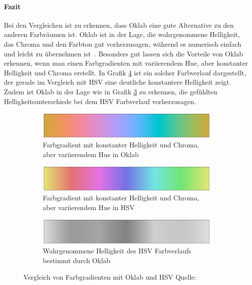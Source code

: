 \documentclass[12pt, a4paper, ngerman]{article}
\begin{document}
\paragraph{Fazit}
Bei den Vergleichen ist zu erkennen, dass Oklab eine gute Alternative zu den anderen Farbräumen ist.
Oklab ist in der Lage, die wahrgenommene Helligkeit, das Chroma und den Farbton gut vorherzusagen, 
während es numerisch einfach und leicht zu übernehmen ist~\cite{Oklab_2020}.
Besonders gut lassen sich die Vorteile von Oklab erkennen, 
wenn man einen Farbgradienten mit variierendem Hue, aber konstanter Helligkeit und Chroma erstellt. 
In Grafik \ref{fig:oklab_hsv} ist ein solcher Farbverlauf dargestellt, der gerade im Vergleich mit HSV eine deutliche konstantere Helligkeit zeigt. 
Zudem ist Oklab in der Lage wie in Grafik \ref{fig:hsv_lightness} zu erkennen, die gefühlten Helligkeitsunterschiede bei dem HSV Farbverlauf vorherzusagen.

\begin{figure}
  \centering
  \begin{subfigure}[b]{\linewidth}
  \centering
  \includegraphics[width=0.9\linewidth]{Grafiken/Oklab_HSV/hue_oklab.png}
  \caption{Farbgradient mit konstanter Helligkeit und Chroma, aber variierendem Hue in Oklab}
  \label{fig:hue_oklab}
  \end{subfigure}
  
  \begin{subfigure}[b]{\linewidth}
  \centering
  \includegraphics[width=0.9\linewidth]{Grafiken/Oklab_HSV/hue_hsv.png}
  \caption{Farbgradient mit konstanter Helligkeit und Chroma, aber variierendem Hue in HSV}
  \label{fig:hue_hsv}
  \end{subfigure}
  
  \begin{subfigure}[b]{\linewidth}
  \centering
  \includegraphics[width=0.9\linewidth]{Grafiken/Oklab_HSV/hue_hsv_lightness.png}
  \caption{Wahrgenommene Helligkeit des HSV Farbverlaufs bestimmt durch Oklab}
  \label{fig:hsv_lightness}
  \end{subfigure}
  
  \caption{Vergleich von Farbgradienten mit Oklab und HSV Quelle:~\cite{Oklab_2020}}
  \label{fig:oklab_hsv}
\end{figure}
\end{document}
